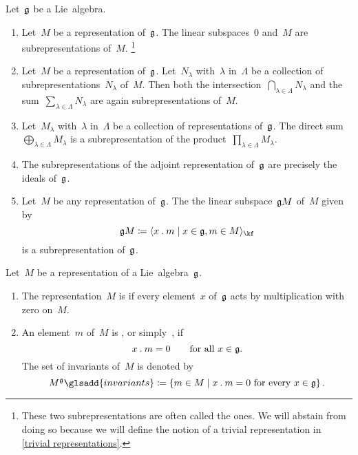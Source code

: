 \begin{examples}
  Let~$\mathfrak{g}$ be a Lie~algebra.
  \begin{enumerate}
    \item
      Let~$M$ be a representation of~$\mathfrak{g}$.
      The linear subspaces~$0$ and~$M$ are subrepresentations of~$M$.%
    \footnote{
      These two subrepresentations are often called the  ones.
      We will abstain from doing so because we will define the notion of a trivial representation in \cref{trivial representations}.
    }
    \item
      Let~$M$ be a representation of~$\mathfrak{g}$.
      Let~$N_\lambda$ with~$\lambda$ in~$\Lambda$ be a collection of subrepresentations~$N_\lambda$ of~$M$.
      Then both the intersection~$\bigcap_{\lambda \in \Lambda} N_\lambda$ and the sum~$\sum_{\lambda \in \Lambda} N_\lambda$ are again subrepresentations of~$M$.
    \item
      Let~$M_\lambda$ with~$\lambda$ in~$\Lambda$ be a collection of representations of~$\mathfrak{g}$.
      The direct sum~$\bigoplus_{\lambda \in \Lambda} M_\lambda$ is a subrepresentation of the product~$\prod_{\lambda \in \Lambda} M_\lambda$.
    \item
      The subrepresentations of the adjoint representation of~$\mathfrak{g}$ are precisely the ideals of~$\mathfrak{g}$.
    \item
      Let~$M$ be any representation of~$\mathfrak{g}$.
      The the linear subspace~$\mathfrak{g} M$ of~$M$ given by
      \[
        \glie M
        \defined
        \gen{
          x \act m
          \suchthat
          x \in \glie,
          m \in M
        }_{\kf}
      \]
      is a subrepresentation of~$\mathfrak{g}$.
  \end{enumerate}
\end{examples}


\begin{definition}
  \label{trivial representations}
  Let~$M$ be a representation of a Lie~algebra~$\mathfrak{g}$.
  \begin{enumerate}
    \item
      The representation~$M$ is  if every element~$x$ of~$\mathfrak{g}$ acts by multiplication with zero on~$M$.
    \item
      An element~$m$ of~$M$ is , or simply~, if
      \[
        x \mathbin{.} m = 0
        \qquad
        \text{for all~$x \in \mathfrak{g}$.}
      \]
      The set of invariants of~$M$ is denoted by
      \[
        M^{\glie}\glsadd{invariants}
        \defined
        \{
          m \in M
        \suchthat
          \text{$x \act m = 0$ for every~$x \in \glie$}
        \}  \,.
      \]
  \end{enumerate}  
\end{definition}


